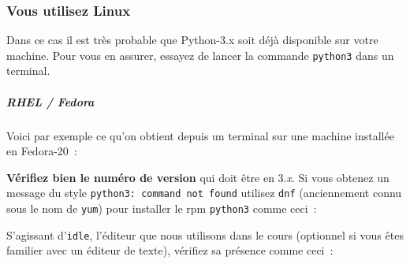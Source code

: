    \hypertarget{vous-utilisez-linux}{%
\subsubsection{Vous utilisez Linux}\label{vous-utilisez-linux}}

    Dans ce cas il est très probable que Python-3.x soit déjà disponible sur
votre machine. Pour vous en assurer, essayez de lancer la commande
\texttt{python3} dans un terminal.

    \hypertarget{rhel-fedora}{%
\subparagraph{RHEL / Fedora}\label{rhel-fedora}}

    Voici par exemple ce qu'on obtient depuis un terminal sur une machine
installée en Fedora-20~:

    \begin{Shaded}
\begin{Highlighting}[frame=lines,framerule=0.6mm,rulecolor=\color{asisframecolor}]
\NormalTok{$ }
\NormalTok{[}\NormalTok{ 6.3.1 20161221 (Red Hat 6.3.1-1)] }
 \NormalTok{, }\NormalTok{, }
\OperatorTok{>>>} 
\end{Highlighting}
\end{Shaded}

    \textbf{Vérifiez bien le numéro de version} qui doit être en 3.\emph{x}.
Si vous obtenez un message du style
\texttt{python3:\ command\ not\ found} utilisez \texttt{dnf}
(anciennement connu sous le nom de \texttt{yum}) pour installer le rpm
\texttt{python3} comme ceci~:

    \begin{Shaded}
\begin{Highlighting}[frame=lines,framerule=0.6mm,rulecolor=\color{asisframecolor}]
\NormalTok{$ }
\end{Highlighting}
\end{Shaded}

    S'agissant d'\texttt{idle}, l'éditeur que nous utilisons dans le cours
(optionnel si vous êtes familier avec un éditeur de texte), vérifiez sa
présence comme ceci~:

    \begin{Shaded}
\begin{Highlighting}[frame=lines,framerule=0.6mm,rulecolor=\color{asisframecolor}]
\NormalTok{$ }
\end{Highlighting}
\end{Shaded}


